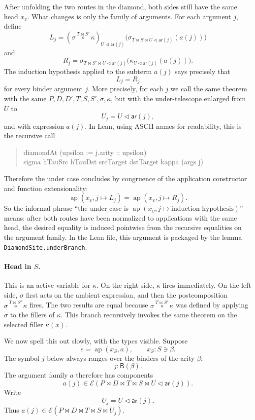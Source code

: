 \documentclass[11pt]{article}
\newcommand{\E}{\mathcal E}
\newcommand{\B}{\mathsf{B}}
\newcommand{\arity}{\mathsf{ar}}
\newcommand{\ext}{\mathbin{\triangleleft}}
\newcommand{\pcomp}[3]{#1 \overset{#2}{\circ} #3}
\begin{document}
After unfolding the two routes in the diamond, both sides still have the same
head \(x_\upsilon\).  What changes is only the family of arguments.  For each
argument \(j\), define
\[
  L_j =
  (\pcomp{\sigma}{T \bowtie S'}{\kappa})_{U \ext \arity(j)}
  \bigl(
    \sigma_{T \bowtie S \bowtie U \ext \arity(j)}(a(j))
  \bigr)
\]
and
\[
  R_j =
  \sigma_{T \bowtie S' \bowtie U \ext \arity(j)}
  \bigl(
    \kappa_{U \ext \arity(j)}(a(j))
  \bigr).
\]
The induction hypothesis applied to the subterm \(a(j)\) says precisely that
\[
  L_j = R_j
\]
for every binder argument \(j\).  More precisely, for each \(j\) we call the
same theorem with the same \(P,D,D',T,S,S',\sigma,\kappa\), but with the
under-telescope enlarged from \(U\) to
\[
  U_j = U \ext \arity(j),
\]
and with expression \(a(j)\).  In Lean, using ASCII names for readability, this
is the recursive call
\begin{quote}
\small\ttfamily
diamondAt (upsilon := j.arity :: upsilon)\\
\hspace*{2em}sigma hTauSrc hTauDst srcTarget dstTarget kappa (args j)
\end{quote}
Therefore the under case concludes by
congruence of the application constructor and function extensionality:
\[
  \operatorname{ap}(x_\upsilon, j \mapsto L_j)
  =
  \operatorname{ap}(x_\upsilon, j \mapsto R_j).
\]
So the informal phrase ``the under case is
\(\operatorname{ap}(x_\upsilon, j \mapsto \text{induction hypothesis})\)''
means: after both routes have been normalized to applications with the same
head, the desired equality is induced pointwise from the recursive equalities
on the argument family.  In the Lean file, this argument is packaged by the
lemma \texttt{DiamondSite.underBranch}.

\paragraph{Head in \(S\).}
This is an active variable for \(\kappa\).  On the right side, \(\kappa\) fires
immediately.  On the left side, \(\sigma\) first acts on the ambient expression,
and then the postcomposition \(\pcomp{\sigma}{T \bowtie S'}{\kappa}\) fires.
The two results are equal because \(\pcomp{\sigma}{T \bowtie S'}{\kappa}\)
was defined by applying \(\sigma\) to the fillers of \(\kappa\).  This branch
recursively invokes the same theorem on the selected filler \(\kappa(x)\).

We now spell this out slowly, with the types visible.  Suppose
\[
  e = \operatorname{ap}(x_S,a),
  \qquad x_S : S \ni \beta.
\]
The symbol \(j\) below always ranges over the binders of the arity \(\beta\):
\[
  j : \B(\beta).
\]
The argument family \(a\) therefore has components
\[
  a(j) \in
  \E(P \bowtie D \bowtie T \bowtie S \bowtie U \ext \arity(j)).
\]
Write
\[
  U_j = U \ext \arity(j).
\]
Thus \(a(j) \in \E(P \bowtie D \bowtie T \bowtie S \bowtie U_j)\).
\end{document}
